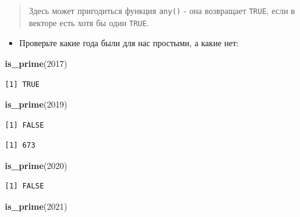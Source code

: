\documentclass[
]{book}
\newenvironment{Shaded}{\begin{snugshade}}{\end{snugshade}}
\newcommand{\CommentTok}[1]{\textcolor[rgb]{0.56,0.35,0.01}{\textit{#1}}}
\newcommand{\DecValTok}[1]{\textcolor[rgb]{0.00,0.00,0.81}{#1}}
\newcommand{\KeywordTok}[1]{\textcolor[rgb]{0.13,0.29,0.53}{\textbf{#1}}}
\newcommand{\NormalTok}[1]{#1}
\newcommand{\OperatorTok}[1]{\textcolor[rgb]{0.81,0.36,0.00}{\textbf{#1}}}
\providecommand{\tightlist}{%
  \setlength{\itemsep}{0pt}\setlength{\parskip}{0pt}}
\begin{document}
\begin{quote}
Здесь может пригодиться функция \texttt{any()} - она возвращает \texttt{TRUE}, если в векторе есть хотя бы один \texttt{TRUE}.
\end{quote}

\begin{itemize}
\tightlist
\item
  Проверьте какие года были для нас простыми, а какие нет:
\end{itemize}

\begin{Shaded}
\begin{Highlighting}[]
\KeywordTok{is_prime}\NormalTok{(}\DecValTok{2017}\NormalTok{)}
\end{Highlighting}
\end{Shaded}

\begin{verbatim}
[1] TRUE
\end{verbatim}

\begin{Shaded}
\begin{Highlighting}[]
\KeywordTok{is_prime}\NormalTok{(}\DecValTok{2019}\NormalTok{)}
\end{Highlighting}
\end{Shaded}

\begin{verbatim}
[1] FALSE
\end{verbatim}

\begin{Shaded}
\end{Shaded}

\begin{verbatim}
[1] 673
\end{verbatim}

\begin{Shaded}
\begin{Highlighting}[]
\KeywordTok{is_prime}\NormalTok{(}\DecValTok{2020}\NormalTok{)}
\end{Highlighting}
\end{Shaded}

\begin{verbatim}
[1] FALSE
\end{verbatim}

\begin{Shaded}
\begin{Highlighting}[]
\KeywordTok{is_prime}\NormalTok{(}\DecValTok{2021}\NormalTok{)}
\end{Highlighting}
\end{Shaded}
\end{document}
